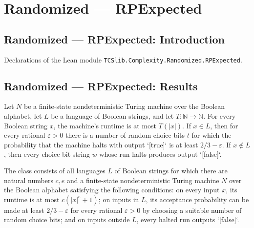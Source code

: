 \section{Randomized --- RPExpected}
\subsection*{Randomized --- RPExpected: Introduction}

Declarations of the Lean module \texttt{TCSlib.Complexity.Randomized.RPExpected}.

\subsection*{Randomized --- RPExpected: Results}

\begin{definition}
\label{Turing.FinNDTM.RDecidesInExpTime}
\leanok
{}
Let $N$ be a finite-state nondeterministic Turing machine over the Boolean alphabet, let
$L$ be a language of Boolean strings, and let $T\colon\mathbb{N}\to\mathbb{N}$. For
every Boolean string $x$, the machine's runtime is at most $T(|x|)$. If $x\in L$, then
for every rational $\varepsilon>0$ there is a number of random choice bits $t$ for which
the probability that the machine halts with output `[true]` is at least
$2/3-\varepsilon$. If $x\notin L$, then every choice-bit string $w$ whose run halts
produces output `[false]`.
\end{definition}

\begin{definition}
\label{Randomized.RP_ExpPTM}
\leanok
{}
The class consists of all languages $L$ of Boolean strings for which there are natural
numbers $c,e$ and a finite-state nondeterministic Turing machine $N$ over the Boolean
alphabet satisfying the following conditions: on every input $x$, its runtime is at most
$c(|x|^e+1)$; on inputs in $L$, its acceptance probability can be made at least
$2/3-\varepsilon$ for every rational $\varepsilon>0$ by choosing a suitable number of
random choice bits; and on inputs outside $L$, every halted run outputs `[false]`.
\end{definition}

